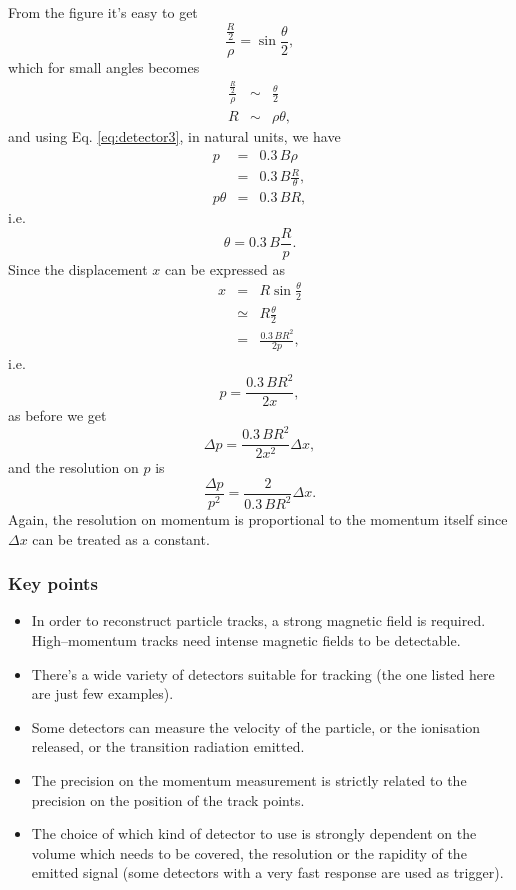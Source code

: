 From the figure it's easy to get
\[\frac{\frac{R}{2}}{\rho} = \sin\frac{\theta}{2},\]
which for small angles becomes
\begin{eqnarray*}
  \frac{\frac{R}{2}}{\rho} &\sim& \frac{\theta}{2}\\
  R &\sim& \rho \theta,
\end{eqnarray*}
and using Eq. \eqref{eq:detector3}, in natural units, we have
\begin{eqnarray*}
  p &=& 0.3\, B\rho\\
    &=& 0.3\,B\frac{R}{\theta},\\
  p\theta &=& 0.3\,BR,
\end{eqnarray*}
i.e.
\[\theta = 0.3\,B\frac{R}{p}.\]
Since the displacement $x$ can be expressed as
\begin{eqnarray*}
  x &=& R\sin\frac{\theta}{2}\\
    &\simeq& R\frac{\theta}{2}  \\
  &=& \frac{0.3\,BR^2}{2p},
\end{eqnarray*}
i.e.
\[p = \frac{0.3\,BR^2}{2x},\]
as before we get
\[\Delta p = \frac{0.3\,BR^2}{2x^2}\Delta x,\]
and the resolution on $p$ is
\[\frac{\Delta p}{p^2} = \frac{2}{0.3\,BR^2}\Delta x.\]
Again, the resolution on momentum is proportional to the momentum itself since $\Delta x$ can be treated as a constant.


\subsubsection*{Key points}
\begin{itemize}
\item In order to reconstruct particle tracks, a strong magnetic field is required. High--momentum tracks need intense magnetic fields to be detectable.
\item There's a wide variety of detectors suitable for tracking (the one listed here are just few examples).
\item Some detectors can measure the velocity of the particle, or the ionisation released, or the transition radiation emitted.
\item The precision on the momentum measurement is strictly related to the precision on the position of the track points.
\item The choice of which kind of detector to use is strongly dependent on the volume which needs to be covered, the resolution or the rapidity of the emitted signal (some detectors with a very fast response are used as trigger).
\end{itemize}
